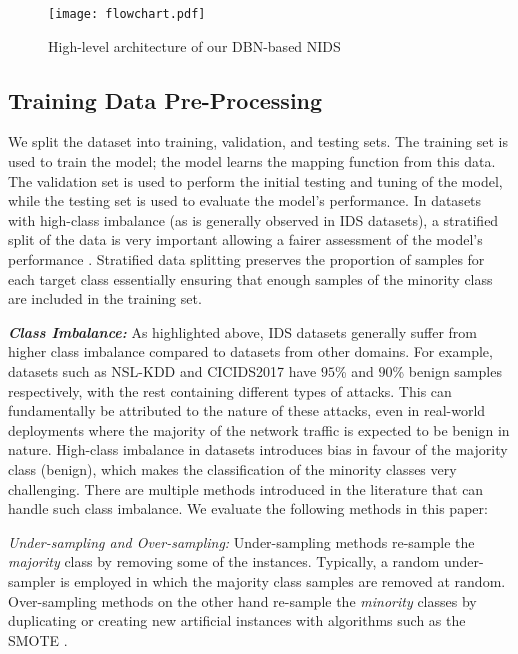 \documentclass[runningheads]{llncs}
\begin{document}
\begin{figure}[t]
    \centering
    \texttt{[image: flowchart.pdf]}
    \caption{High-level architecture of our \ac{DBN}-based \ac{NIDS}}
    \label{fig:flowchart}
\end{figure}

\subsection{Training Data Pre-Processing}
\label{subsec:data processing}

We split the dataset into training, validation, and testing sets. The training set is used to train the model; the model learns the mapping function from this data. The validation set is used to perform the initial testing and tuning of the model, while the testing set is used to evaluate the model's performance.
In datasets with high-class imbalance (as is generally observed in \ac{IDS} datasets), a stratified split of the data is very important allowing a fairer assessment of the model's performance \cite{Hammerla}. 
Stratified data splitting preserves the proportion of samples for each target class essentially ensuring that enough samples of the minority class are included in the training set.

\textbf{\textit{Class Imbalance:}}
As highlighted above, \ac{IDS} datasets generally suffer from higher class imbalance compared to datasets from other domains.
For example, datasets such as NSL-KDD and CICIDS2017 have $95$\% and $90$\% benign samples respectively, with the rest containing different types of attacks.
This can fundamentally be attributed to the nature of these attacks, even in real-world deployments where the majority of the network traffic is expected to be benign in nature.
High-class imbalance in datasets introduces bias in favour of the majority class (benign), which makes the classification of the minority classes very challenging. There are multiple methods introduced in the literature that can handle such class imbalance. We evaluate the following methods in this paper: 

\textit{Under-sampling and Over-sampling:}
Under-sampling methods re-sample the \emph{majority} class by removing some of the instances.
Typically, a random under-sampler is employed in which the majority class samples are removed at random.
Over-sampling methods on the other hand re-sample the \emph{minority} classes by duplicating or creating new artificial instances with algorithms such as the \ac{SMOTE} \cite{SMOTE}.
\end{document}
